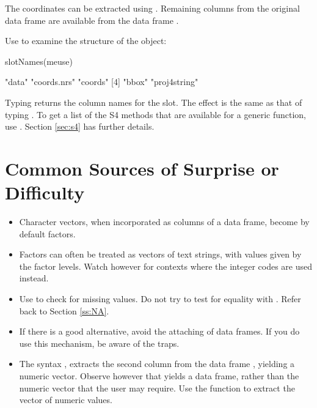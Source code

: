 The coordinates can be extracted using .
Remaining columns from the original data frame are available from the
data frame .

Use  to examine the structure of the object:
\begin{Schunk}
\begin{Sinput}
slotNames(meuse)
\end{Sinput}
\begin{Soutput}
[1] "data"        "coords.nrs"  "coords"     
[4] "bbox"        "proj4string"
\end{Soutput}
\end{Schunk}
  Typing  returns
the column names for the  slot.  The effect is the
same as that of typing .  To get a list of the
S4 methods that are available for a generic function, use
. Section \ref{sec:s4} has further details.

\section{Common Sources of Surprise or Difficulty}\label{sec:difficult}
\begin{itemize}
\item[] Character vectors, when incorporated as columns of a data frame,
become by default factors.

\item[] Factors can often be treated as vectors of text strings, with
values given by the factor levels. Watch however for contexts where
the integer codes are used instead.

\item[] Use  to check for missing values.  Do not try
  to test for equality with .  Refer back to Section
  \ref{ss:NA}.

\item[] If there is a good alternative, avoid the attaching of data
  frames.   If you do use this mechanism, be aware of the traps.

\item[] The syntax , extracts the second
  column from the data frame , yielding a numeric
  vector.  Observe however that  yields a
  data frame, rather than the numeric vector that the user may
  require.  Use the function  to extract the vector
of numeric values.
\end{itemize}

